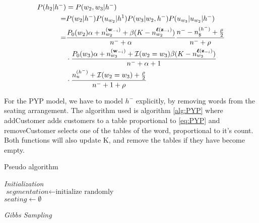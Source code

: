 \begin{align}
P(h_2 | h^-) &= P(w_2,w_3|h^-)\\
=&P(w_2|h^-)P(u_{w_2}|h^1)P(w_3 | w_2,h^-)P(u_{w_3}|u_{w_2}|h^-) \\
=& \dfrac{P_0(w_2)\alpha + n_{w_2}^{(\bm{\mathbf{w}}_{-i})}+ \beta (K - n_{w_2}^{\bm{\mathbf{\ell}}(\bm{\mathbf{z}}_{-i})})}{n^- + \alpha}
\dfrac{n^- - n_\$^{(h^-)} + \frac{\rho}{2}}{n^- + \rho} \\
&\cdot 
\dfrac{P_0(w_3)\alpha + n_{w_3}^{(\bm{\mathbf{w}}_{-i})}+ \mathcal{I}(w_2 = w_3) \beta (K - n_{w_3}^{\bm{\mathbf{\ell}}(\bm{\mathbf{z}}_{-i})})}{n^- + \alpha + 1} \\
&\cdot
\dfrac{n_u^{(h^-)} + \mathcal{I}(w_2 = w_3)  + \frac{\rho}{2}}{n^- + 1 + \rho}
\end{align}

For the PYP model, we have to model $h^-$ explicitly, by removing words from the seating arrangement. The algorithm used is algorithm \ref{alg:PYP} where addCustomer adds customers to a table proportional to \eqref{eq:PYP} and removeCustomer selects one of the tables of the word, proportional to it's count. Both functions will also update K, and remove the tables if they have become empty.

\begin{algorithm}[H]
	\caption{Pseudo algorithm}
    \label{alg:PYP}
    \nonl  \SetSideCommentLeft \emph{Initialization} \\
    $\textit{segmentation} \gets \text{initialize randomly}$ \\ 
    $seating \gets \emptyset$ \\
    
     
     \nonl \SetSideCommentLeft \emph{Gibbs Sampling}

  \end{algorithm}
  
